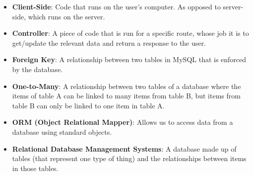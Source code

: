 \begin{itemize}[leftmargin=*]
    \item
        \textbf{Client-Side}:
        Code that runs on the user's computer. As opposed to server-side, which runs on the server.
    \item
        \textbf{Controller}:
        A piece of code that is run for a specific route, whose job it is to get/update the relevant data and return a response to the user.
    \item
        \textbf{Foreign Key}:
        A relationship between two tables in MySQL that is enforced by the database.
    \item
        \textbf{One-to-Many}:
        A relationship between two tables of a database where the items of table A can be linked to many items from table B, but items from table B can only be linked to one item in table A.
    \item
        \textbf{ORM (Object Relational Mapper)}:
        Allows us to access data from a database using standard objects.
    \item
        \textbf{Relational Database Management Systems}:
        A database made up of tables (that represent one type of thing) and the relationships between items in those tables.
\end{itemize}

